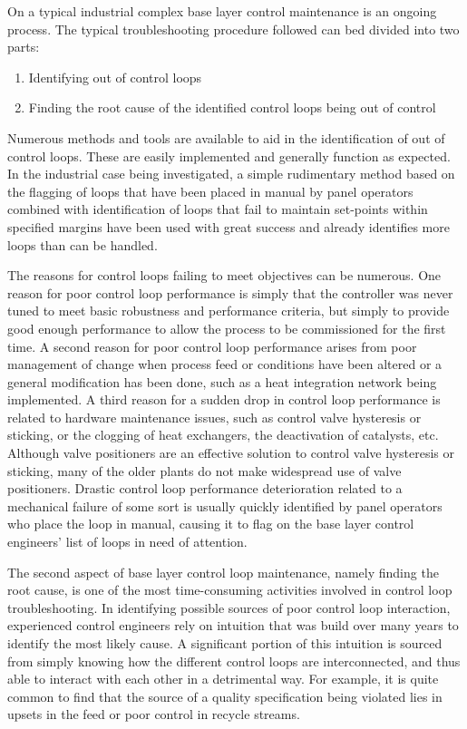 \documentclass{article}
\begin{document}
On a typical industrial complex base layer control maintenance is an ongoing process.
The typical troubleshooting procedure followed can bed divided into two parts:
\begin{enumerate}
\item Identifying out of control loops
\item Finding the root cause of the identified control loops being out of control
\end{enumerate}

Numerous methods and tools are available to aid in the identification of out of control loops.
These are easily implemented and generally function as expected.
In the industrial case being investigated, a simple rudimentary method based on the flagging of loops that have been placed in manual by panel operators combined with identification of loops that fail to maintain set-points within specified margins have been used with great success and already identifies more loops than can be handled.

The reasons for control loops failing to meet objectives can be numerous.
One reason for poor control loop performance is simply that the controller was never tuned to meet basic robustness and performance criteria, but simply to provide good enough performance to allow the process to be commissioned for the first time.
A second reason for poor control loop performance arises from poor management of change when process feed or conditions have been altered or a general modification has been done, such as a heat integration network being implemented.
A third reason for a sudden drop in control loop performance is related to hardware maintenance issues, such as control valve hysteresis or sticking, or the clogging of heat exchangers, the deactivation of catalysts, etc.
Although valve positioners are an effective solution to control valve hysteresis or sticking, many of the older plants do not make widespread use of valve positioners.
Drastic control loop performance deterioration related to a mechanical failure of some sort is usually quickly identified by panel operators who place the loop in manual, causing it to flag on the base layer control engineers' list of loops in need of attention.

The second aspect of base layer control loop maintenance, namely finding the root cause, is one of the most time-consuming activities involved in control loop troubleshooting.
In identifying possible sources of poor control loop interaction, experienced control engineers rely on intuition that was build over many years to identify the most likely cause.
A significant portion of this intuition is sourced from simply knowing how the different control loops are interconnected, and thus able to interact with each other in a detrimental way.
For example, it is quite common to find that the source of a quality specification being violated lies in upsets in the feed or poor control in recycle streams.
\end{document}
